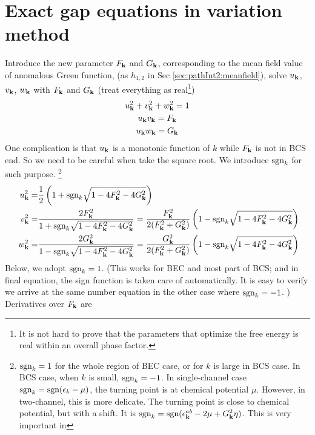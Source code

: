  \section{Exact gap equations in variation method}
Introduce the new parameter $F_{\mathbf{k}}$ and $G_{\mathbf{k}}$, corresponding to the mean field value of anomalous Green function,  (as $h_{1,2}$  in Sec \ref{sec:pathInt2:meanfield}), solve $u_{\mathbf{k}}$, $v_{\mathbf{k}}$, $w_{\mathbf{k}}$ with $F_{\mathbf{k}}$ and $G_{\mathbf{k}}$ (treat everything as real\footnote{It is not hard to prove that the parameters that optimize the free energy is real within an overall phase factor. })
\begin{gather}
u_{\mathbf{k}}^2+v^{2}_{\mathbf{k}}+w^{2}_{\mathbf{k}}=1\\
u_{\mathbf{k}}v_{\mathbf{k}}=F_{\mathbf{k}}\\
u_{\mathbf{k}}w_{\mathbf{k}}=G_{\mathbf{k}}
\end{gather}
One complication is that $u_{\mathbf{k}}$ is a monotonic function of $k$ while $F_{\mathbf{k}}$ is not in BCS end.  So we need to be careful when take the square root.  We introduce $\text{sgn}_k$ for such purpose.  \footnote{\label{foot:20100909:sgn} $\text{sgn}_k=1$  for the whole region of BEC case, or for $k$ is large in BCS case. In BCS case, when $k$ is small, $\text{sgn}_{k}=-1$.  In single-channel case $\text{sgn}_{k}=\text{sgn}(\epsilon_{k}-\mu)$, the turning point is at chemical potential $\mu$.  However, in two-channel, this is more delicate.  The turning point is close to chemical potential, but with a shift. It is $\text{sgn}_k=\text{sgn}(\epsilon^{ab}_{\mathbf{k}}-2\mu+  G_{\mathbf{k}}^2\eta)$.  This is very important in }
\begin{equation}
\begin{split}
u_{\mathbf{k}}^2=&\frac{1}{2} \left(1+\text{sgn}_{k}\sqrt{1-4 F_{\mathbf{k}}^2-4 G_{\mathbf{k}}^2}\right)\\
v^{2}_{\mathbf{k}}=&\frac{2 F_{\mathbf{k}}^2}{1+\text{sgn}_{k}\sqrt{1-4 F_{\mathbf{k}}^2-4 G_{\mathbf{k}}^2}}
=\frac{ F_{\mathbf{k}}^2}{2( F_{\mathbf{k}}^2+ G_{\mathbf{k}}^2)} \left(1-\text{sgn}_{k}\sqrt{1-4 F_{\mathbf{k}}^2-4 G_{\mathbf{k}}^2}\right)\\\
w^{2}_{\mathbf{k}}=&\frac{2 G_{\mathbf{k}}^2}{1-\text{sgn}_{k}\sqrt{1-4 F_{\mathbf{k}}^2-4 G_{\mathbf{k}}^2}}
=\frac{G_{\mathbf{k}}^2}{2( F_{\mathbf{k}}^2+ G_{\mathbf{k}}^2)} \left(1-\text{sgn}_{k}\sqrt{1-4 F_{\mathbf{k}}^2-4 G_{\mathbf{k}}^2}\right)
\end{split}
\end{equation}
Below, we adopt $\text{sgn}_k=1$. (This works for BEC and most part of BCS; and in final equation, the sign function is taken care of automatically.  It is easy to verify we arrive at the same number equation in the other case where $\text{sgn}_{k}=-1$. ) Derivatives over $F_{\mathbf{k}}$ are

